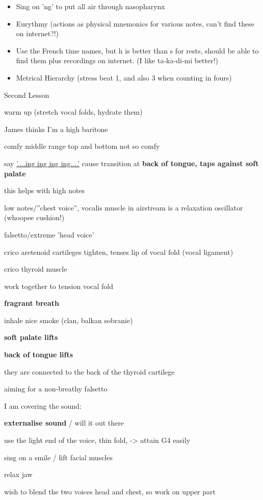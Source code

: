 \documentclass[14pt,a4paper]{memoir}
\begin{document}
\begin{itemize}
\item Sing on 'ng' to put all air through nasopharynx

\item Eurythmy (actions as physical mnemonics for various notes, can't find these on internet?!)

\item Use the French time names, but h is better than s for rests, should be able to find them plus recordings on internet. (I like ta-ka-di-mi better!)

\item Metrical Hierarchy (stress beat 1, and also 3 when counting in fours)

\end{itemize}

Second Lesson

warm up (stretch vocal folds, hydrate them)

James thinks I'm a high baritone

comfy middle range top and bottom not so comfy

say \underline{'....ing ing ing ing....'} cause transition at \textbf{back of tongue, taps against soft palate}

this helps with high notes



low notes/''chest voice'', vocalis muscle in airstream is a relaxation oscillator (whoopee cushion!)



falsetto/extreme 'head voice'

crico aretenoid cartileges tighten, tenses lip of vocal fold (vocal ligament)

crico thyroid muscle

work together to tension vocal fold




\textbf {fragrant breath}

inhale nice smoke (clan, balkan sobranie)

\textbf {soft palate lifts}

\textbf {back of tongue lifts}

they are connected to the back of the thyroid cartilege

aiming for a non-breathy falsetto


I am covering the sound:

\textbf{externalise sound} / will it out there


use the light end of the voice,  thin fold, -> attain G4 easily



sing on a smile / lift facial muscles

relax jaw

wish to blend the two voices head and chest, so work on upper part
\end{document}
